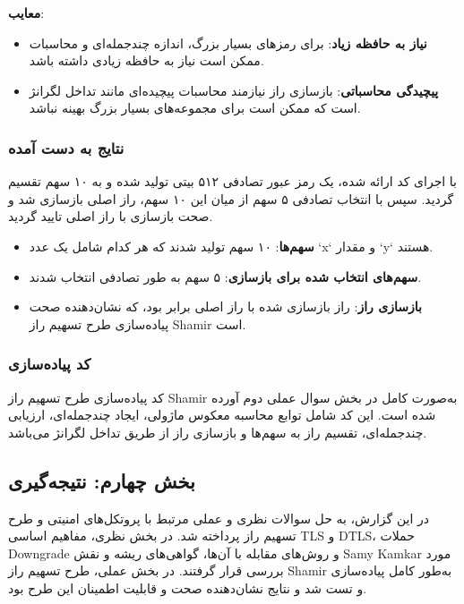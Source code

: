 \documentclass{report}
\begin{document}
\textbf{معایب}:
\begin{itemize}
	\item \textbf{نیاز به حافظه زیاد}:
	      برای رمزهای بسیار بزرگ، اندازه چندجمله‌ای و محاسبات ممکن است نیاز به حافظه زیادی داشته باشد.
	\item \textbf{پیچیدگی محاسباتی}:
	      بازسازی راز نیازمند محاسبات پیچیده‌ای مانند تداخل لگرانژ است که ممکن است برای مجموعه‌های بسیار بزرگ بهینه نباشد.
\end{itemize}

\subsubsection*{نتایج به دست آمده}
 با اجرای کد ارائه شده، یک رمز عبور تصادفی ۵۱۲ بیتی تولید شده و به ۱۰ سهم تقسیم گردید. سپس با انتخاب تصادفی ۵ سهم از میان این ۱۰ سهم، راز اصلی بازسازی شد و صحت بازسازی با راز اصلی تایید گردید.

\begin{itemize}
	\item \textbf{سهم‌ها}:
	 ۱۰ سهم تولید شدند که هر کدام شامل یک عدد `x` و مقدار `y` هستند.
	\item \textbf{سهم‌های انتخاب شده برای بازسازی}:
	 ۵ سهم به طور تصادفی انتخاب شدند.
	\item \textbf{بازسازی راز}:
	 راز بازسازی شده با راز اصلی برابر بود، که نشان‌دهنده صحت پیاده‌سازی طرح تسهیم راز Shamir است.
\end{itemize}

 \subsubsection*{کد پیاده‌سازی}
 کد پیاده‌سازی طرح تسهیم راز Shamir به‌صورت کامل در بخش سوال عملی دوم آورده شده است. این کد شامل توابع محاسبه معکوس ماژولی، ایجاد چندجمله‌ای، ارزیابی چندجمله‌ای، تقسیم راز به سهم‌ها و بازسازی راز از طریق تداخل لگرانژ می‌باشد.

 \subsection*{بخش چهارم: نتیجه‌گیری}

 در این گزارش، به حل سوالات نظری و عملی مرتبط با پروتکل‌های امنیتی و طرح تسهیم راز پرداخته شد. در بخش نظری، مفاهیم اساسی TLS و DTLS، حملات Downgrade و روش‌های مقابله با آن‌ها، گواهی‌های ریشه و نقش Samy Kamkar مورد بررسی قرار گرفتند. در بخش عملی، طرح تسهیم راز Shamir به‌طور کامل پیاده‌سازی و تست شد و نتایج نشان‌دهنده صحت و قابلیت اطمینان این طرح بود.
\end{document}
